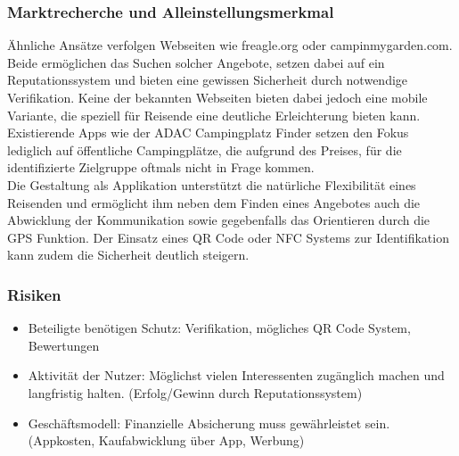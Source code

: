 \subsubsection{Marktrecherche und Alleinstellungsmerkmal}
Ähnliche Ansätze verfolgen Webseiten wie freagle.org oder campinmygarden.com. Beide ermöglichen das Suchen solcher Angebote, setzen dabei auf ein Reputationssystem und bieten eine gewissen Sicherheit durch notwendige Verifikation. Keine der bekannten Webseiten bieten dabei jedoch eine mobile Variante, die speziell für Reisende eine deutliche Erleichterung bieten kann. Existierende Apps wie der ADAC Campingplatz Finder setzen den Fokus lediglich auf öffentliche Campingplätze, die aufgrund des Preises, für die identifizierte Zielgruppe oftmals nicht in Frage kommen.\\
Die Gestaltung als Applikation unterstützt die natürliche Flexibilität eines Reisenden und ermöglicht ihm neben dem Finden eines Angebotes auch die Abwicklung der Kommunikation sowie gegebenfalls das Orientieren durch die GPS Funktion. Der Einsatz eines QR Code oder NFC Systems zur Identifikation kann zudem die Sicherheit deutlich steigern.


\subsubsection{Risiken}
\begin{itemize}
   \item Beteiligte benötigen Schutz: Verifikation, mögliches QR Code System, Bewertungen
   \item Aktivität der Nutzer: Möglichst vielen Interessenten zugänglich machen und langfristig halten. (Erfolg/Gewinn durch Reputationssystem)
   \item Geschäftsmodell: Finanzielle Absicherung muss gewährleistet sein. (Appkosten, Kaufabwicklung über App, Werbung)
\end{itemize}
